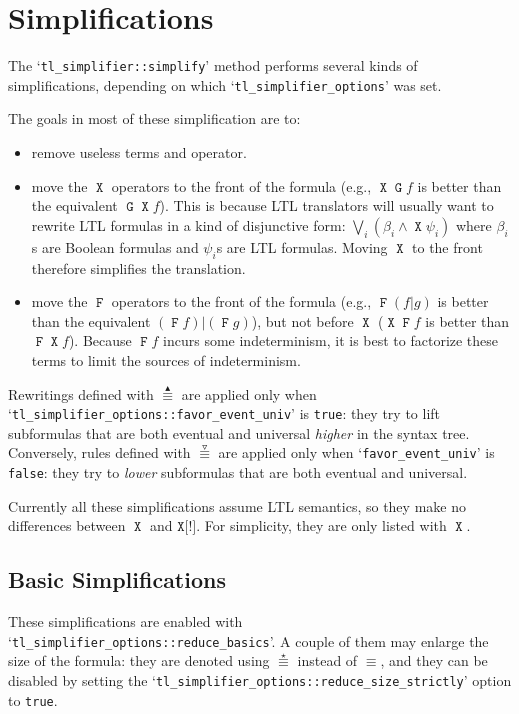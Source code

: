 \documentclass[a4paper,twoside,10pt,DIV=12]{scrreprt}
\DeclareMathOperator{\F}{\texttt{F}}
\DeclareMathOperator{\G}{\texttt{G}}
\DeclareMathOperator{\X}{\texttt{X}}
\newcommand{\StrongX}{\texttt{X[!]}}
\newcommand{\OR}{\mathbin{\texttt{|}}}
\newcommand{\0}{\texttt{0}}
\newcommand{\1}{\texttt{1}}
\newcommand{\equiV}{\stackrel{\star}{\equiv}}
\newcommand{\equivEU}{\stackrel{\blacktriangleup}{\equiv}}
\newcommand{\equivNeu}{\stackrel{\smalltriangledown}{\equiv}}
\begin{document}
\section{Simplifications}

The `\verb|tl_simplifier::simplify|' method performs several kinds of
simplifications, depending on which `\verb|tl_simplifier_options|'
was set.

The goals in most of these simplification are to:
\begin{itemize}
\item remove useless terms and operator.
\item move the $\X$ operators to the front of the formula (e.g., $\X\G
  f$ is better than the equivalent $\G\X f$).  This is because LTL
  translators will usually want to rewrite LTL formulas in
  a kind of disjunctive form: $\displaystyle\bigvee_i
  \left(\beta_i\land\X\psi_i\right)$ where $\beta_i$s are Boolean
  formulas and $\psi_i$s are LTL formulas.  Moving $\X$ to the
  front therefore simplifies the translation.
\item move the $\F$ operators to the front of the formula (e.g., $\F(f
  \OR g)$ is better than the equivalent $(\F f)\OR (\F g)$), but not
  before $\X$ ($\X\F f$ is better than $\F\X f$).  Because $\F f$
  incurs some indeterminism, it is best to factorize these terms to
  limit the sources of indeterminism.
\end{itemize}

Rewritings defined with $\equivEU$ are applied only when
`\verb|tl_simplifier_options::favor_event_univ|' is \texttt{true}:
they try to lift subformulas that are both eventual and universal
\emph{higher} in the syntax tree.  Conversely, rules defined with $\equivNeu$
are applied only when `\verb|favor_event_univ|' is \texttt{false}: they
try to \textit{lower} subformulas that are both eventual and universal.

Currently all these simplifications assume LTL semantics, so they make
no differences between $\X$ and $\StrongX$. For simplicity, they are
only listed with $\X$.

\subsection{Basic Simplifications}\label{sec:basic-simp}

These simplifications are enabled with
`\verb|tl_simplifier_options::reduce_basics|'.  A couple of them may
enlarge the size of the formula: they are denoted using $\equiV$
instead of $\equiv$, and they can be disabled by setting the
`\verb|tl_simplifier_options::reduce_size_strictly|' option to
\texttt{true}.
\end{document}
